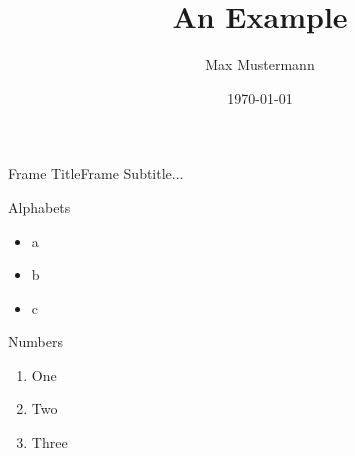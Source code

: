 \documentclass[aspectratio=169]{beamer}
\title{An Example}
\author{Max Mustermann}
\date{\today}
\begin{document}
{\fontUbuntu

\maketitle

\begin{frame}[plain]{{\fontUbuntu Frame Title}}{{\fontUbuntu Frame Subtitle...}}
  \begin{block}{{\fontUbuntu Alphabets}}
    \begin{itemize}
    \item a
    \item b
    \item c
    \end{itemize}
  \end{block}
  \begin{block}{{\fontUbuntu Numbers}}
    \begin{enumerate}
    \item One
    \item Two
    \item Three
    \end{enumerate}
  \end{block}
\end{frame}

}
\end{document}

